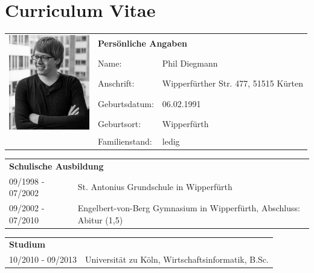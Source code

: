 \section*{\hspace{0.2cm}Curriculum Vitae} 

\begin{flushleft}

\begin{tabular}{p{11em} p{10em} p{10em}}
    \multirow{5}{*}{\includegraphics[width=9.5em]{figures/passfoto.jpg}} &     \multicolumn{2}{l}{\textbf{Persönliche Angaben}} \\
    & Name: & Phil Diegmann \\
    & Anschrift: & Wipperfürther Str. 477, 51515 Kürten \\
    & Geburtsdatum: & 06.02.1991 \\
    & Geburtsort: & Wipperfürth \\
    & Familienstand: & ledig \\
\end{tabular}

\vspace{0.5em}

\begin{tabular}{p{11em} p{22.5em}}
    \multicolumn{2}{l}{\textbf{Schulische Ausbildung}} \\
    09/1998 - 07/2002 & St. Antonius Grundschule in Wipperfürth \\
    09/2002 - 07/2010 & Engelbert-von-Berg Gymnasium in Wipperfürth, Abschluss: Abitur (1,5) \\
\end{tabular}

\vspace{0.5em}

\begin{tabular}{p{11em} p{22.5em}}
    \multicolumn{2}{l}{\textbf{Studium}} \\
    10/2010 - 09/2013 & Universität zu Köln, Wirtschaftsinformatik, B.Sc. \\
\end{tabular}


\end{flushleft}
